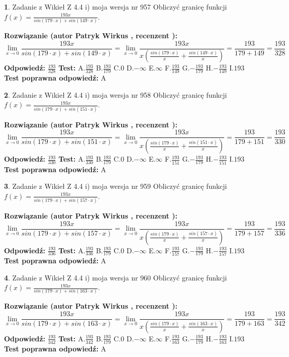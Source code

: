 \documentclass[12pt, a4paper]{article}
\theoremstyle{definition} %
\newtheorem{zad}{}
\newcommand{\zadStart}[1]{\begin{zad}#1\newline}
\newcommand{\zadStop}{\end{zad}}
\newcommand{\rozwStart}[2]{\noindent \textbf{Rozwiązanie (autor #1 , recenzent #2): }\newline}
\newcommand{\rozwStop}{\newline}
\newcommand{\odpStart}{\noindent \textbf{Odpowiedź:}\newline}
\newcommand{\odpStop}{\newline}
\newcommand{\testStart}{\noindent \textbf{Test:}\newline}
\newcommand{\testStop}{\newline}
\newcommand{\kluczStart}{\noindent \textbf{Test poprawna odpowiedź:}\newline}
\newcommand{\kluczStop}{\newline}
\begin{document}
\zadStart{Zadanie z Wikieł Z 4.4 i) moja wersja nr 957}
Obliczyć granicę funkcji $f(x)=\frac{193x}{sin(179\cdot x) +sin(149\cdot x)}$.
\zadStop
\rozwStart{Patryk Wirkus}{}
$$\lim\limits_{x\to 0}\frac{193x}{sin(179\cdot x) +sin(149\cdot x)}=\lim\limits_{x\to 0}\frac{193x}{x(\frac{sin(179\cdot x)}{x}+\frac{sin(149\cdot x)}{x})}=\frac{193}{179+149} = \frac{193}{328}$$
\rozwStop
\odpStart
$\frac{193}{328}$
\odpStop
\testStart
A.$\frac{193}{328}$
B.$\frac{193}{179}$
C.$0$
D.$-\infty$
E.$\infty$
F.$\frac{193}{149}$
G.$-\frac{193}{179}$
H.$-\frac{193}{149}$
I.$193$
\testStop
\kluczStart
A
\kluczStop



\zadStart{Zadanie z Wikieł Z 4.4 i) moja wersja nr 958}
Obliczyć granicę funkcji $f(x)=\frac{193x}{sin(179\cdot x) +sin(151\cdot x)}$.
\zadStop
\rozwStart{Patryk Wirkus}{}
$$\lim\limits_{x\to 0}\frac{193x}{sin(179\cdot x) +sin(151\cdot x)}=\lim\limits_{x\to 0}\frac{193x}{x(\frac{sin(179\cdot x)}{x}+\frac{sin(151\cdot x)}{x})}=\frac{193}{179+151} = \frac{193}{330}$$
\rozwStop
\odpStart
$\frac{193}{330}$
\odpStop
\testStart
A.$\frac{193}{330}$
B.$\frac{193}{179}$
C.$0$
D.$-\infty$
E.$\infty$
F.$\frac{193}{151}$
G.$-\frac{193}{179}$
H.$-\frac{193}{151}$
I.$193$
\testStop
\kluczStart
A
\kluczStop



\zadStart{Zadanie z Wikieł Z 4.4 i) moja wersja nr 959}
Obliczyć granicę funkcji $f(x)=\frac{193x}{sin(179\cdot x) +sin(157\cdot x)}$.
\zadStop
\rozwStart{Patryk Wirkus}{}
$$\lim\limits_{x\to 0}\frac{193x}{sin(179\cdot x) +sin(157\cdot x)}=\lim\limits_{x\to 0}\frac{193x}{x(\frac{sin(179\cdot x)}{x}+\frac{sin(157\cdot x)}{x})}=\frac{193}{179+157} = \frac{193}{336}$$
\rozwStop
\odpStart
$\frac{193}{336}$
\odpStop
\testStart
A.$\frac{193}{336}$
B.$\frac{193}{179}$
C.$0$
D.$-\infty$
E.$\infty$
F.$\frac{193}{157}$
G.$-\frac{193}{179}$
H.$-\frac{193}{157}$
I.$193$
\testStop
\kluczStart
A
\kluczStop



\zadStart{Zadanie z Wikieł Z 4.4 i) moja wersja nr 960}
Obliczyć granicę funkcji $f(x)=\frac{193x}{sin(179\cdot x) +sin(163\cdot x)}$.
\zadStop
\rozwStart{Patryk Wirkus}{}
$$\lim\limits_{x\to 0}\frac{193x}{sin(179\cdot x) +sin(163\cdot x)}=\lim\limits_{x\to 0}\frac{193x}{x(\frac{sin(179\cdot x)}{x}+\frac{sin(163\cdot x)}{x})}=\frac{193}{179+163} = \frac{193}{342}$$
\rozwStop
\odpStart
$\frac{193}{342}$
\odpStop
\testStart
A.$\frac{193}{342}$
B.$\frac{193}{179}$
C.$0$
D.$-\infty$
E.$\infty$
F.$\frac{193}{163}$
G.$-\frac{193}{179}$
H.$-\frac{193}{163}$
I.$193$
\testStop
\kluczStart
A
\kluczStop
\end{document}
